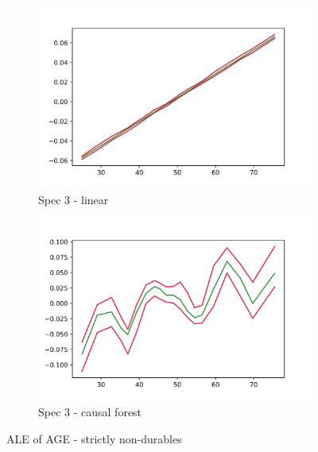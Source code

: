 \begin{figure}[h]
    \begin{subfigure}{0.5\linewidth}
        \includegraphics[width=\linewidth]{figures/ALE/chSNDexp/spec3_linear_AGE.png}
        \caption{Spec 3 - linear}
    \end{subfigure}%
    \begin{subfigure}{0.5\linewidth}
        \includegraphics[width=\linewidth]{figures/ALE/chSNDexp/spec3_cf_AGE.png}
        \caption{Spec 3 - causal forest}
    \end{subfigure}
    \caption{ALE of AGE - strictly non-durables}
    \label{app:ale_age_snd}
\end{figure}

